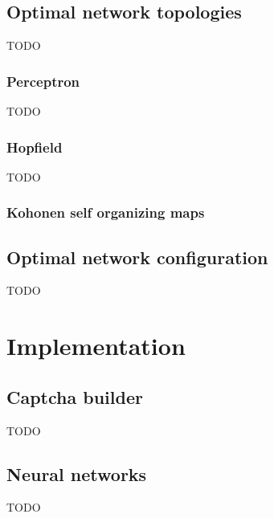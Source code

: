 \documentclass[pdftex,a4paper,12pt,twoside]{report}
\theoremstyle{plain} \newtheorem{theorem}{Theorem} \newtheorem{proposition}{Proposition} \newtheorem{lemma}{Lemma} \newtheorem*{corollary}{Corollary}
\theoremstyle{definition} \newtheorem{definition}{Definition} \newtheorem{conjecture}{Conjecture} \newtheorem*{example}{Example} \newtheorem{algorithm}{Algorithm}
\theoremstyle{remark} \newtheorem*{remark}{Remark} \newtheorem*{note}{Note} \newtheorem{case}{Case}
\begin{document}
\subsection{Optimal network topologies}
TODO
\subsubsection{Perceptron}
TODO
\subsubsection{Hopfield}
TODO
\subsubsection{Kohonen self organizing maps}
\subsection{Optimal network configuration}
TODO
\section{Implementation}
\label{sec:implementation}
\subsection{Captcha builder}
TODO
\subsection{Neural networks}
TODO
\end{document}
